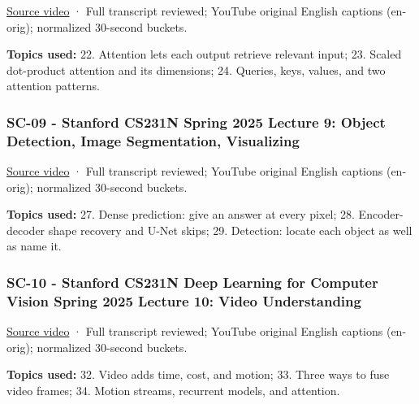 \hypertarget{04-visual-computing-ii-ch036-sc-08---stanford-cs231n-spring-2025-lecture-8-attention-and-transformers}{}

\href{https://www.youtube.com/watch?v=RQowiOF_FvQ}{Source video} · Full transcript reviewed; YouTube original English captions (en-orig); normalized 30-second buckets.

\textbf{Topics used:} 22. Attention lets each output retrieve relevant input; 23. Scaled dot-product attention and its dimensions; 24. Queries, keys, values, and two attention patterns.

\subsubsection{SC-09 - Stanford CS231N Spring 2025 Lecture 9: Object Detection, Image Segmentation, Visualizing}\label{04-visual-computing-ii-ch036-sc-09---stanford-cs231n-spring-2025-lecture-9-object-detection-image-segmentation-visualizing}

\hypertarget{04-visual-computing-ii-ch036-sc-09---stanford-cs231n-spring-2025-lecture-9-object-detection-image-segmentation-visualizing}{}

\href{https://www.youtube.com/watch?v=PTypu6GqEd4}{Source video} · Full transcript reviewed; YouTube original English captions (en-orig); normalized 30-second buckets.

\textbf{Topics used:} 27. Dense prediction: give an answer at every pixel; 28. Encoder-decoder shape recovery and U-Net skips; 29. Detection: locate each object as well as name it.

\subsubsection{SC-10 - Stanford CS231N Deep Learning for Computer Vision Spring 2025 Lecture 10: Video Understanding}\label{04-visual-computing-ii-ch036-sc-10---stanford-cs231n-deep-learning-for-computer-vision-spring-2025-lecture-10-video-understanding}

\hypertarget{04-visual-computing-ii-ch036-sc-10---stanford-cs231n-deep-learning-for-computer-vision-spring-2025-lecture-10-video-understanding}{}

\href{https://www.youtube.com/watch?v=wElqklprhPE}{Source video} · Full transcript reviewed; YouTube original English captions (en-orig); normalized 30-second buckets.

\textbf{Topics used:} 32. Video adds time, cost, and motion; 33. Three ways to fuse video frames; 34. Motion streams, recurrent models, and attention.

